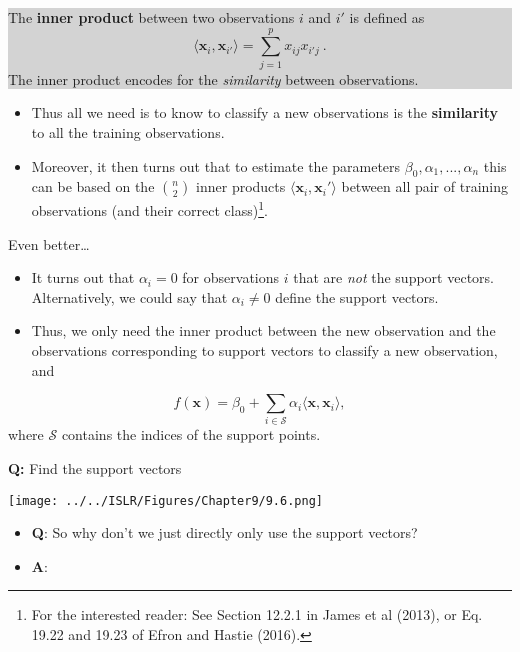 \documentclass[10pt,ignorenonframetext,]{beamer}
\providecommand{\tightlist}{%
  \setlength{\itemsep}{0pt}\setlength{\parskip}{0pt}}
\begin{document}
\begin{frame}

\begin{center}
\colorbox{lightgray}{\begin{minipage}{10cm}
The {\bf inner product} between two observations $i$ and $i'$ is defined as
$$
\langle {\boldsymbol x}_i , {\boldsymbol x}_{i'}\rangle =\sum_{j=1}^p x_{ij} x_{i' j} \ .
$$
The inner product encodes for the \emph{similarity} between observations.
\end{minipage}}
\end{center}

\begin{itemize}
\item
  Thus all we need is to know to classify a new observations is the
  \textbf{similarity} to all the training observations.
\item
  Moreover, it then turns out that to estimate the parameters
  \(\beta_0,\alpha_1,...,\alpha_n\) this can be based on the
  \({n \choose 2}\) inner products
  \(\langle {\boldsymbol x}_i,{\boldsymbol x}_i' \rangle\) between all
  pair of training observations (and their correct
  class)\footnote{For the interested reader: See Section 12.2.1 in James et al (2013), or Eq. 19.22 and 19.23 of Efron and Hastie (2016).}.
\end{itemize}

\end{frame}

\begin{frame}

Even better\ldots{}

\begin{itemize}
\item
  It turns out that \(\alpha_i=0\) for observations \(i\) that are
  \emph{not} the support vectors. Alternatively, we could say that
  \(\alpha_i \neq 0\) define the support vectors.
\item
  Thus, we only need the inner product between the new observation and
  the observations corresponding to support vectors to classify a new
  observation, and
\end{itemize}

\[
f({\boldsymbol x})=\beta_0 + \sum_{i \in \mathcal{S}} \alpha_i \langle {\boldsymbol x}, {\boldsymbol x}_i\rangle,
\] where \(\mathcal{S}\) contains the indices of the support points.

\end{frame}

\begin{frame}

\textbf{Q:} Find the support vectors

\texttt{[image: ../../ISLR/Figures/Chapter9/9.6.png]}

\begin{itemize}
\tightlist
\item
  \textbf{Q}: So why don't we just directly only use the support
  vectors?
\item
  \textbf{A}: 
\end{itemize}

\end{frame}
\end{document}
